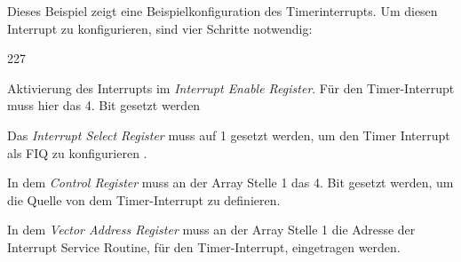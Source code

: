 \newpage
\noindent
Dieses Beispiel zeigt eine Beispielkonfiguration des Timerinterrupts. Um diesen Interrupt zu konfigurieren, sind vier Schritte notwendig:
\begin{dinglist}{227}
	\item{Aktivierung des Interrupts im \textit{Interrupt Enable Register}. F\"ur den Timer-Interrupt muss hier das 4. Bit gesetzt werden \parencite[vgl.  Tabelle 4-40][227]{archManI}}
	\item{Das \textit{Interrupt Select Register} muss auf 1 gesetzt werden, um den Timer Interrupt als FIQ zu konfigurieren \parencite[vgl Tabelle 3-5][39]{vic}.}
	\item{In dem \textit{Control Register} muss an der Array Stelle 1 das 4. Bit gesetzt werden, um die Quelle von dem Timer-Interrupt zu definieren.}
	\item{In dem \textit{Vector Address Register} muss an der Array Stelle 1 die Adresse der Interrupt Service Routine, f\"ur den Timer-Interrupt, eingetragen werden.}
\end{dinglist}


